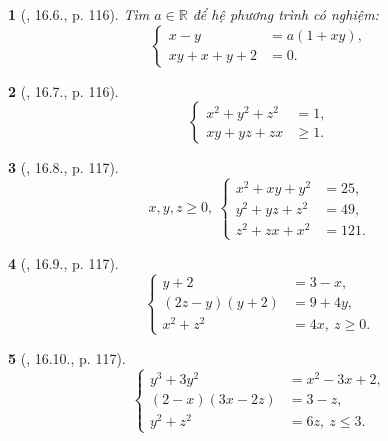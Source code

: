 \documentclass{article}
\newtheorem{baitoan}{}
\begin{document}
\begin{baitoan}[\cite{TLCT_THCS_Toan_9_dai_so}, 16.6., p. 116]
	Tìm $a\in\mathbb{R}$ để hệ phương trình có nghiệm:
	\begin{equation*}
		\left\{\begin{split}
			x - y &= a(1 + xy),\\
			xy + x + y + 2 &= 0.
		\end{split}\right.
	\end{equation*}
\end{baitoan}

\begin{baitoan}[\cite{TLCT_THCS_Toan_9_dai_so}, 16.7., p. 116]
	\begin{equation*}
		\left\{\begin{split}
			x^2 + y^2 + z^2 &= 1,\\
			xy + yz + zx&\ge1.
		\end{split}\right.
	\end{equation*}
\end{baitoan}

\begin{baitoan}[\cite{TLCT_THCS_Toan_9_dai_so}, 16.8., p. 117]
	\begin{equation*}
		x,y,z\ge0,\ \left\{\begin{split}
			x^2 + xy + y^2 &= 25,\\
			y^2 + yz + z^2 &= 49,\\
			z^2 + zx + x^2 &= 121.
		\end{split}\right.
	\end{equation*}
\end{baitoan}

\begin{baitoan}[\cite{TLCT_THCS_Toan_9_dai_so}, 16.9., p. 117]
	\begin{equation*}
		\left\{\begin{split}
			y + 2 &= 3 - x,\\
			(2z - y)(y + 2) &= 9 + 4y,\\
			x^2 + z^2 &= 4x,\ z\ge0.
		\end{split}\right.
	\end{equation*}
\end{baitoan}

\begin{baitoan}[\cite{TLCT_THCS_Toan_9_dai_so}, 16.10., p. 117]
	\begin{equation*}
		\left\{\begin{split}
			y^3 + 3y^2 &= x^2 - 3x + 2,\\
			(2 - x)(3x - 2z) &= 3 - z,\\
			y^2 + z^2 &= 6z,\ z\le3.
		\end{split}\right.
	\end{equation*}
\end{baitoan}
\end{document}

